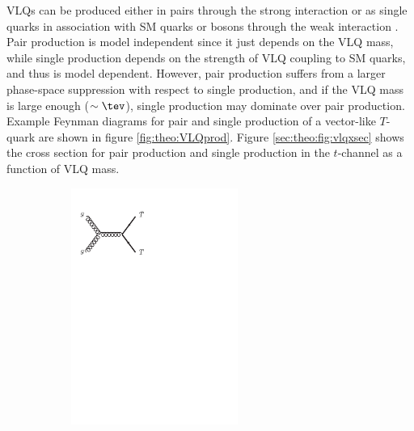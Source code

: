 VLQs can be produced either in pairs through the strong interaction or as single quarks in association with SM quarks or bosons through the weak interaction \cite{Buchkremer:2013bha}.
Pair production is model independent since it just depends on the VLQ mass, while single production depends on the strength of VLQ coupling to SM quarks, and thus is model dependent. However, pair production suffers from a larger phase-space suppression with respect to single production, and if the VLQ mass is large enough ($\sim \tev$), single production may dominate over pair production. Example Feynman diagrams for pair and single production of a vector-like $T$-quark are shown in figure \ref{fig:theo:VLQprod}. Figure \ref{sec:theo:fig:vlqxsec} shows the cross section for pair production and single production in the $t$-channel as a function of VLQ mass.
\begin{figure}[h!]
\begin{subfigure}{0.5\textwidth}
  \centering
  \includegraphics[width=0.6\textwidth]{figures/Theory/T_pairProd_good.pdf}
  \caption{}
  \label{}
\end{subfigure}
\begin{subfigure}{0.5\textwidth}
  \centering

\end{subfigure}
\end{figure}
